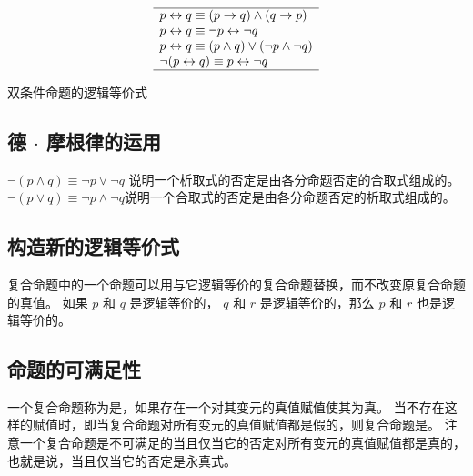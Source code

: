 {{\begin{minipage}[c]{\textwidth{}}
\begin{minipage}[c]{.4\textwidth{}}
\begin{minipage}[c]{\textwidth{}}
\begin{table}[H]
                        \[
                            \begin{array}{l}
                                \hline
                                p \leftrightarrow q \equiv (p \rightarrow q) \wedge (q \rightarrow p) \\
                                p \leftrightarrow q \equiv \neg p \leftrightarrow \neg q \\
                                p \leftrightarrow q \equiv (p \wedge q) \vee (\neg p \wedge \neg q) \\
                                \neg (p \leftrightarrow q) \equiv p \leftrightarrow \neg q \\
                                \hline
                            \end{array}
                        \]

                        \caption{双条件命题的逻辑等价式}
                    \end{table}
                \end{minipage}
            \end{minipage}
        \end{minipage}
    }

    \subsection{德 $\cdot$ 摩根律的运用}
    {
        $\neg (p \wedge q) \equiv \neg p \vee \neg q$ 说明一个析取式的否定是由各分命题否定的合取式组成的。
        $\neg (p \vee q) \equiv \neg p \wedge \neg q$说明一个合取式的否定是由各分命题否定的析取式组成的。
    }

    \subsection{构造新的逻辑等价式}
    {
        复合命题中的一个命题可以用与它逻辑等价的复合命题替换，而不改变原复合命题的真值。
        如果 $p$ 和 $q$ 是逻辑等价的， $q$ 和 $r$ 是逻辑等价的，那么 $p$ 和 $r$ 也是逻辑等价的。
    }

    \subsection{命题的可满足性}
    {
        一个复合命题称为是，如果存在一个对其变元的真值赋值使其为真。
        当不存在这样的赋值时，即当复合命题对所有变元的真值赋值都是假的，则复合命题是。
        注意一个复合命题是不可满足的当且仅当它的否定对所有变元的真值赋值都是真的，也就是说，当且仅当它的否定是永真式。

}}
